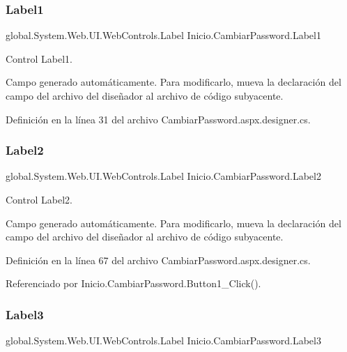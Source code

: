\subsubsection{\texorpdfstring{Label1}{Label1}}
{\footnotesize\ttfamily global.\+System.\+Web.\+U\+I.\+Web\+Controls.\+Label Inicio.\+Cambiar\+Password.\+Label1\hspace{0.3cm}{\ttfamily [protected]}}



Control Label1. 

Campo generado automáticamente. Para modificarlo, mueva la declaración del campo del archivo del diseñador al archivo de código subyacente. 

Definición en la línea 31 del archivo Cambiar\+Password.\+aspx.\+designer.\+cs.

\mbox{\label{classInicio_1_1CambiarPassword_ab4a6fd8e13543ff98bc786be8a2b3a1c}} 
\subsubsection{\texorpdfstring{Label2}{Label2}}
{\footnotesize\ttfamily global.\+System.\+Web.\+U\+I.\+Web\+Controls.\+Label Inicio.\+Cambiar\+Password.\+Label2\hspace{0.3cm}{\ttfamily [protected]}}



Control Label2. 

Campo generado automáticamente. Para modificarlo, mueva la declaración del campo del archivo del diseñador al archivo de código subyacente. 

Definición en la línea 67 del archivo Cambiar\+Password.\+aspx.\+designer.\+cs.



Referenciado por Inicio.\+Cambiar\+Password.\+Button1\+\_\+\+Click().

\mbox{\label{classInicio_1_1CambiarPassword_a4aa07cf906d98059cf6158cf3e31800a}} 
\subsubsection{\texorpdfstring{Label3}{Label3}}
{\footnotesize\ttfamily global.\+System.\+Web.\+U\+I.\+Web\+Controls.\+Label Inicio.\+Cambiar\+Password.\+Label3\hspace{0.3cm}{\ttfamily [protected]}}




